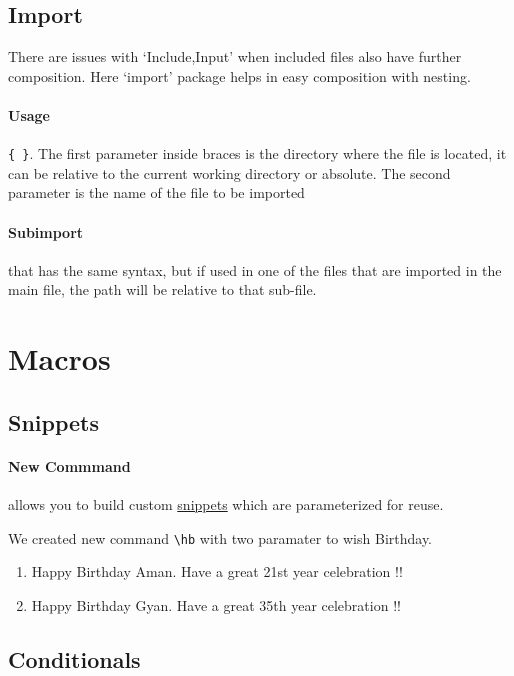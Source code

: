 \documentclass{report}[a4paper,12pt] %
\begin{document}
\subsection{Import}
There are issues with `Include,Input' when included files also have further composition. Here `import' package helps in easy composition with nesting. 

\paragraph{Usage} \verb|{ }|. The first parameter inside braces is the directory where the file is located, it can be relative to the current working directory or absolute. The second parameter is the name of the file to be imported

\paragraph{Subimport} \verb|| that has the same syntax, but if used in one of the files that are imported in the main file, the path will be relative to that sub-file.

\section{Macros}
\subsection{Snippets}
\paragraph{New Commmand} allows you to build custom \href{https://www.physicsread.com/latex-newcommand/}{snippets} which are parameterized for reuse.

\newcommand{\hb}[2]{Happy Birthday #1. Have a great #2 year celebration !!}

We created new command \verb|\hb| with two paramater to wish Birthday.
\begin{enumerate}
  \item \hb{Aman}{21st}
  \item \hb{Gyan}{35th}
\end{enumerate}

\subsection{Conditionals}
\newcommand{\solution}[1][\empty]{\ifthenelse{\isempty{#1}}{There is no solution !!}{Solution: #1}}
\end{document}
